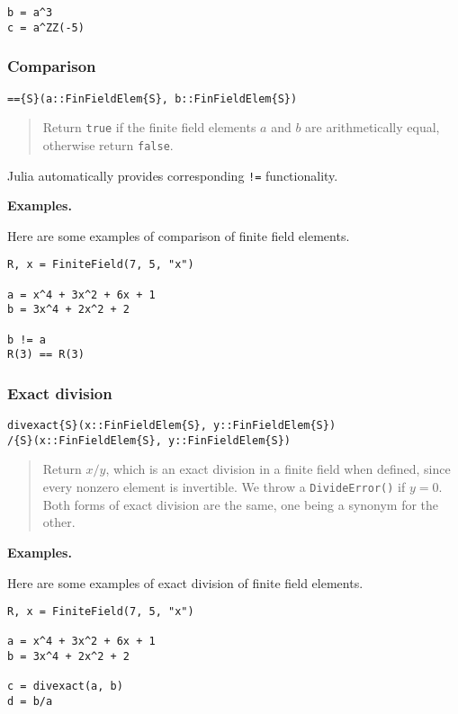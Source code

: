 \documentclass[a4paper,10pt]{article}
\newcommand{\code}{\lstinline}
\newcommand{\desc}[1]{\vspace{-3mm}\begin{quote}#1\end{quote}}
\begin{document}
{{{\begin{lstlisting}
b = a^3
c = a^ZZ(-5)
\end{lstlisting}

\subsubsection{Comparison}

\begin{lstlisting}
=={S}(a::FinFieldElem{S}, b::FinFieldElem{S})
\end{lstlisting}

\desc{Return \code{true} if the finite field elements $a$ and $b$ are 
arithmetically equal, otherwise return \code{false}.}

Julia automatically provides corresponding \code{!=} functionality.

\textbf{Examples.}

Here are some examples of comparison of finite field elements.

\begin{lstlisting}
R, x = FiniteField(7, 5, "x")

a = x^4 + 3x^2 + 6x + 1
b = 3x^4 + 2x^2 + 2

b != a
R(3) == R(3)
\end{lstlisting}

\subsubsection{Exact division}

\begin{lstlisting}
divexact{S}(x::FinFieldElem{S}, y::FinFieldElem{S})
/{S}(x::FinFieldElem{S}, y::FinFieldElem{S})
\end{lstlisting}

\desc{Return $x/y$, which is an exact division in a finite field when defined,
since every nonzero element is invertible. We throw a \code{DivideError()} if
$y = 0$. Both forms of exact division are the same, one being a synonym for 
the other.}

\textbf{Examples.}

Here are some examples of exact division of finite field elements.

\begin{lstlisting}
R, x = FiniteField(7, 5, "x")

a = x^4 + 3x^2 + 6x + 1
b = 3x^4 + 2x^2 + 2

c = divexact(a, b)
d = b/a
\end{lstlisting}

}}}
\end{document}
